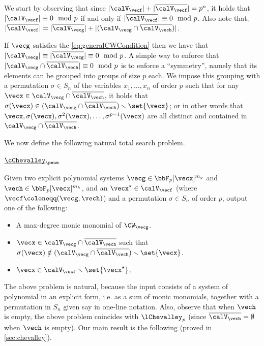 We start by observing that since $|\calV_{\vecf}| + |\overline{\calV_{\vecf}}| = p^n$, it holds that $|\calV_{\vecf}| \equiv 0 \mod{p}$ if and only if $|\overline{\calV_{\vecf}}| \equiv 0 \mod{p}$. Also note that, $|\overline{\calV_{\vecf}}| = |\overline{\calV_{\vecg}}| + |(\calV_{\vecg} \cap \overline{\calV_{\vech}})|$.


If $\vecg$ satisfies the \eqref{eq:generalCWCondition} then we have that $|\calV_{\vecg}| \equiv |\overline{\calV_{\vecg}}| \equiv 0 \mod{p}$. A simple way to enforce that $|\calV_{\vecg} \cap \overline{\calV_{\vech}}| \equiv 0 \mod{p}$ is to enforce a ``symmetry'', namely that its elements can be grouped into groups of size $p$ each. We impose this grouping with a permutation $\sigma \in S_n$ of the variables $x_1, \ldots, x_n$ of order $p$ such that for any $\vecx \in \calV_{\vecg} \cap \overline{\calV_{\vech}}$, it holds that $\sigma(\vecx) \in (\calV_{\vecg} \cap \overline{\calV_{\vech}}) \smallsetminus \set{\vecx}$; or in other words that $\vecx, \sigma(\vecx), \sigma^2(\vecx), \ldots, \sigma^{p-1}(\vecx)$ are all distinct and contained in $\calV_{\vecg} \cap \overline{\calV_{\vech}}$.

We now define the
following natural total search problem.

\bigskip

\noindent $\underbar{\cChevalley}_{\pnum}$

\noindent Given two explicit polynomial systems $\vecg \in \bbF_p[\vecx]^{m_g}$ and $\vech \in \bbF_p[\vecx]^{m_h}$, and an $\vecx^{\star} \in \calV_{\vecf}$ (where $\vecf \coloneqq (\vecg, \vech)$) and a
permutation $\sigma \in S_n$ of order $p$, output one of the following:\vspace{-0.5mm}
\begin{itemize}
	\item[$\triangleright$] [{\em Refuting Witness} -- 1] A max-degree monic monomial of $\CW_{\vecg}$.
  \item[$\triangleright$] [{\em Refuting Witness} -- 2] $\vecx \in \calV_{\vecg} \cap \overline{\calV_{\vech}}$ such that $\sigma(\vecx) \notin (\calV_{\vecg} \cap \overline{\calV_{\vech}}) \smallsetminus \set{\vecx}$.
	\item[$\triangleright$] $\vecx \in \calV_{\vecf} \smallsetminus \set{\vecx^{\star}}$.
\end{itemize}
\medskip

\noindent The above problem is natural, because the input consists of a system of polynomial in an
explicit form, i.e. as a sum of monic monomials, together with a permutation in $S_n$ given say in
one-line notation. Also, observe that when $\vech$ is empty, the above problem coincides with $\lChevalley_p$ (since $\overline{\calV_{\vech}} = \emptyset$ when $\vech$ is empty). Our main result is the following (proved in \autoref{sec:chevalley}).
